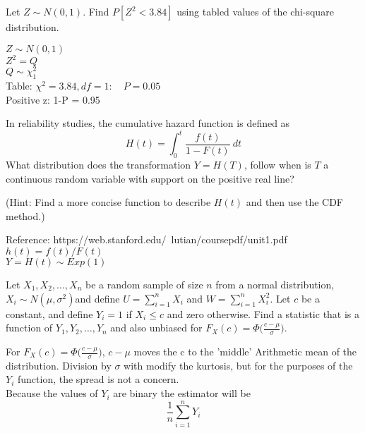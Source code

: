 \documentclass[answers]{exam}
\begin{document}
\begin{questions}
\question 
Let \(Z \sim N(0,1)\). Find \(P[Z^2<3.84]\) using tabled values of the chi-square distribution.
\begin{solution}
	\(Z \sim N(0,1)\) \\
	\(Z^2 = Q\) \\
	\(Q \sim \chi^2_1\) \\
	Table: \(\chi^2=3.84,df=1: \quad P=0.05\) \\
	Positive z: 1-P = 0.95
\end{solution}

\question 
In reliability studies, the cumulative hazard function is defined as
\[H(t)=\int_{0}^{t}\frac{f(t)}{1-F(t)} \ dt\]
What distribution does the transformation \(Y=H(T)\), 
follow when is \(T\) a continuous random variable with support on the positive real line?

(Hint: Find a more concise function to describe \(H(t)\) and then use the CDF method.)
\begin{solution}
	Reference: https://web.stanford.edu/~lutian/coursepdf/unit1.pdf \\
	\(h(t) = f(t)/F(t)\) \\
	$Y = H(t) \sim Exp(1)$
\end{solution}

\question 
Let \(X_1,X_2,\ldots,X_n\) be a random sample of size \(n\) from a normal distribution, 
\(X_i \sim N(\mu,\sigma^2)\)and define \(U=\sum_{i=1}^{n}X_i\) and \(W=\sum_{i=1}^{n}X_i^2\). 
Let \(c\) be a constant, and define \(Y_i=1\) if \(X_i\leq c\) and zero otherwise. 
Find a statistic that is a function of \(Y_1,Y_2,\ldots,Y_n\) and also unbiased for 
\(F_X(c)=\Phi\bigg(\frac{c-\mu}{\sigma}\bigg)\).
\begin{solution}
	For \(F_X(c) = \Phi\bigg(\frac{c-\mu}{\sigma}\bigg)\),
	\(c-\mu\) moves the c to the 'middle' Arithmetic mean of the distribution.
	Division by $\sigma$ with modify the kurtosis, but for the purposes of the $Y_i$
	function, the spread is not a concern. \\
	Because the values of \(Y_i\) are binary the estimator will be
	\[\frac{1}{n}\sum_{i=1}^{n}Y_i\]
\end{solution}


\end{questions}
\end{document}
